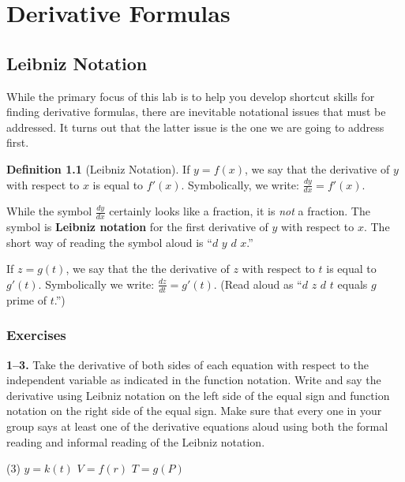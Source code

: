 \documentclass[10pt,oneside,]{book}
\newcommand{\terminology}[1]{\textbf{#1}}
\theoremstyle{plain}
\theoremstyle{definition}
\newtheorem{definition}[theorem]{Definition}
\numberwithin{equation}{section}
\newcommand{\fe}[2]{#1\mathopen{}\left(#2\right)\mathclose{}}
\newcommand{\fd}[1]{#1'}
\newcommand{\lz}[2]{\frac{d#1}{d#2}}
\begin{document}
\chapter[Derivative Formulas]{Derivative Formulas}\label{chapter-derivative-formulas}
\typeout{************************************************}
\typeout{************************************************}
\section[Leibniz Notation]{Leibniz Notation}\label{section-leibniz-notation}
While the primary focus of this lab is to help you develop shortcut skills for finding derivative formulas, there are inevitable notational issues that must be addressed.  It turns out that the latter issue is the one we are going to address first.%
\begin{definition}[Leibniz Notation]\label{definition-9}
If \(y=\fe{f}{x}\), we say that the derivative of \(y\) with respect to \(x\) is equal to \(\fe{\fd{f}}{x}\). Symbolically, we write: \(\lz{y}{x}=\fe{\fd{f}}{x}\).%
\par
While the symbol \(\lz{y}{x}\) certainly looks like a fraction, it is \emph{not} a fraction.  The symbol is \terminology{Leibniz notation} for the first derivative of \(y\) with respect to \(x\).  The short way of reading the symbol aloud is ``\(d\) \(y\) \(d\) \(x\).''%
\par
If \(z=\fe{g}{t}\), we say that the the derivative of \(z\) with respect to \(t\) is equal to \(\fe{\fd{g}}{t}\).  Symbolically we write: \(\lz{z}{t}=\fe{\fd{g}}{t}\). (Read aloud as ``\(d\) \(z\) \(d\) \(t\) equals \(g\) prime of \(t\).'')%
\end{definition}
\typeout{************************************************}
\typeout{************************************************}
\subsection[Exercises]{Exercises}\label{exercises-31}
\textbf{1--3. }\hypertarget{exercisegroup-70}{\null}Take the derivative of both sides of each equation with respect to the independent variable as indicated in the function notation.  Write and say the derivative using Leibniz notation on the left side of the equal sign and function notation on the right side of the equal sign.  Make sure that every one in your group says at least one of the derivative equations aloud using both the formal reading and informal reading of the Leibniz notation.%
\par
\begin{exercisegroup}(3)
\exercise[1.]\hypertarget{exercise-346}{\null}\(y=\fe{k}{t}\)%
\exercise[2.]\hypertarget{exercise-347}{\null}\(V=\fe{f}{r}\)%
\exercise[3.]\hypertarget{exercise-348}{\null}\(T=\fe{g}{P}\)%
\end{exercisegroup}
\par\smallskip\noindent
\typeout{************************************************}
\typeout{************************************************}
\end{document}
